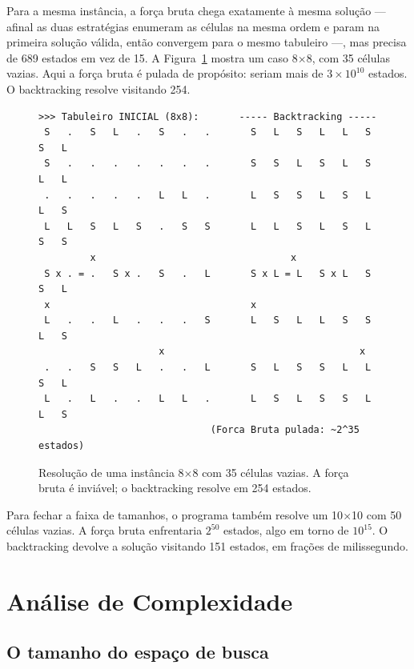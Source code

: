 \documentclass[12pt]{article}
\begin{document}
Para a mesma instância, a força bruta chega exatamente à mesma solução --- afinal as duas estratégias enumeram as células na mesma ordem e param na primeira solução válida, então convergem para o mesmo tabuleiro ---, mas precisa de 689 estados em vez de 15. A Figura~\ref{fig:exec8} mostra um caso 8$\times$8, com 35 células vazias. Aqui a força bruta é pulada de propósito: seriam mais de $3 \times 10^{10}$ estados. O backtracking resolve visitando 254.

\begin{figure}[!ht]
\centering
\begin{footnotesize}
\begin{verbatim}
>>> Tabuleiro INICIAL (8x8):       ----- Backtracking -----
 S   .   S   L   .   S   .   .       S   L   S   L   L   S   S   L
 S   .   .   .   .   .   .   .       S   S   L   S   L   S   L   L
 .   .   .   .   .   L   L   .       L   S   S   L   S   L   L   S
 L   L   S   L   S   .   S   S       L   L   S   L   S   L   S   S
         x                                  x
 S x . = .   S x .   S   .   L       S x L = L   S x L   S   S   L
 x                                   x
 L   .   .   L   .   .   .   S       L   S   L   L   S   S   L   S
                     x                                  x
 .   .   S   S   L   .   .   L       S   L   S   S   L   L   S   L
 L   .   L   .   .   L   L   .       L   S   L   S   S   L   L   S
                              (Forca Bruta pulada: ~2^35 estados)
\end{verbatim}
\end{footnotesize}
\caption{Resolução de uma instância 8$\times$8 com 35 células vazias. A força bruta é inviável; o backtracking resolve em 254 estados.}
\label{fig:exec8}
\end{figure}

Para fechar a faixa de tamanhos, o programa também resolve um 10$\times$10 com 50 células vazias. A força bruta enfrentaria $2^{50}$ estados, algo em torno de $10^{15}$. O backtracking devolve a solução visitando 151 estados, em frações de milissegundo.

\section{Análise de Complexidade}
\label{sec:complexidade}

\subsection{O tamanho do espaço de busca}
\end{document}
